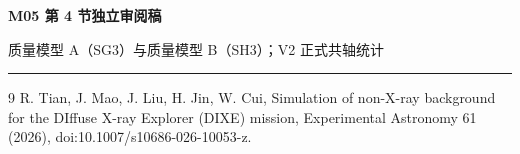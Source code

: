 \documentclass[11pt]{article}
\begin{document}
\setcounter{section}{3}
\begin{center}
{\Large\bfseries M05 第 4 节独立审阅稿}\par
\vspace{0.35em}
{\small 质量模型 A（SG3）与质量模型 B（SH3）；V2 正式共轴统计}\par
\end{center}
\vspace{0.5em}
\noindent\rule{\textwidth}{0.4pt}



\begin{thebibliography}{9}
R. Tian, J. Mao, J. Liu, H. Jin, W. Cui,
Simulation of non-X-ray background for the DIffuse X-ray Explorer (DIXE) mission,
Experimental Astronomy 61 (2026), doi:10.1007/s10686-026-10053-z.
\end{thebibliography}
\end{document}
